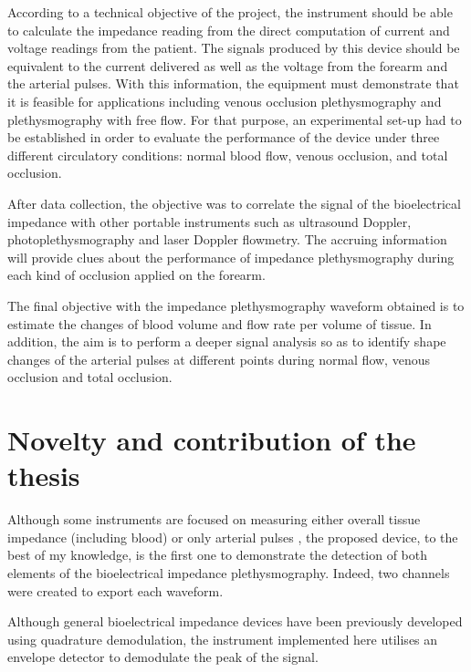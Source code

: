 According to a technical objective of the project, the instrument should be able to calculate the impedance reading from the direct computation of current and voltage readings from the patient. The signals produced by this device should be equivalent to the current delivered as well as the voltage from the forearm and the arterial pulses. With this information, the equipment must demonstrate that it is feasible for applications including venous occlusion plethysmography and plethysmography with free flow. For that purpose, an experimental set-up had to be established in order to evaluate the performance of the device under three different circulatory conditions: normal blood flow, venous occlusion, and total occlusion. 

After data collection, the objective was to correlate the signal of the bioelectrical impedance with other portable instruments such as ultrasound Doppler, photoplethysmography and laser Doppler flowmetry. The accruing information will provide clues about the performance of impedance plethysmography during each kind of occlusion applied on the forearm. 

The final objective with the impedance plethysmography waveform obtained is to estimate the changes of blood volume and flow rate per volume of tissue. In addition, the aim is to perform a  deeper signal analysis so as to identify shape changes of the arterial pulses at different points during normal flow, venous occlusion and total occlusion. 

\section{Novelty and contribution of the thesis}

Although some instruments are focused on measuring either overall tissue impedance (including blood) \cite{mohapatra1979measurement, costeloe1980continuous, yamakoshi1980limb} or only arterial pulses \cite{porter1985measurement, corciova2011peripheral, brown1975impedance, marks1985computer}, the proposed device, to the best of my knowledge, is the first one to demonstrate the detection of both elements of the bioelectrical impedance plethysmography. Indeed, two channels were created to export each waveform. 

Although general bioelectrical impedance devices have been previously developed using quadrature demodulation, the instrument implemented here utilises an envelope detector to demodulate the peak of the signal.

